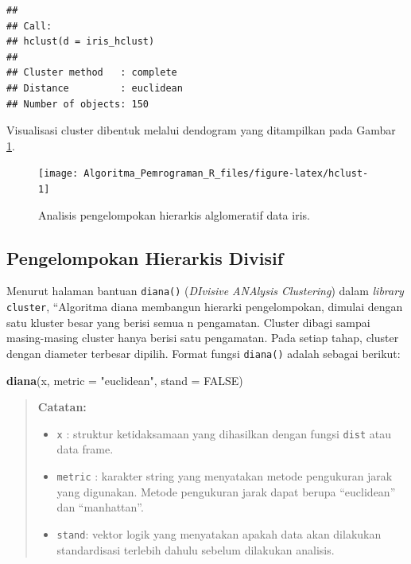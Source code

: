 \documentclass[
]{book}
\newenvironment{Shaded}{\begin{snugshade}}{\end{snugshade}}
\newcommand{\AttributeTok}[1]{\textcolor[rgb]{0.13,0.29,0.53}{#1}}
\newcommand{\ConstantTok}[1]{\textcolor[rgb]{0.56,0.35,0.01}{#1}}
\newcommand{\FunctionTok}[1]{\textcolor[rgb]{0.13,0.29,0.53}{\textbf{#1}}}
\newcommand{\NormalTok}[1]{#1}
\newcommand{\StringTok}[1]{\textcolor[rgb]{0.31,0.60,0.02}{#1}}
\providecommand{\tightlist}{%
  \setlength{\itemsep}{0pt}\setlength{\parskip}{0pt}}
\theoremstyle{definition}
\theoremstyle{definition}
\theoremstyle{definition}
\theoremstyle{definition}
\theoremstyle{remark}
\begin{document}
\begin{verbatim}
## 
## Call:
## hclust(d = iris_hclust)
## 
## Cluster method   : complete 
## Distance         : euclidean 
## Number of objects: 150
\end{verbatim}

Visualisasi cluster dibentuk melalui dendogram yang ditampilkan pada Gambar \ref{fig:hclust}.

\begin{figure}

{\centering \texttt{[image: Algoritma\_Pemrograman\_R\_files/figure-latex/hclust-1]} 

}

\caption{Analisis pengelompokan hierarkis alglomeratif data iris.}\label{fig:hclust}
\end{figure}

\hypertarget{pengelompokan-hierarkis-divisif}{%
\subsection{Pengelompokan Hierarkis Divisif}\label{pengelompokan-hierarkis-divisif}}

Menurut halaman bantuan \texttt{diana()} (\emph{DIvisive ANAlysis Clustering}) dalam \emph{library} \texttt{cluster}, ``Algoritma diana membangun hierarki pengelompokan, dimulai dengan satu kluster besar yang berisi semua n pengamatan. Cluster dibagi sampai masing-masing cluster hanya berisi satu pengamatan. Pada setiap tahap, cluster dengan diameter terbesar dipilih. Format fungsi \texttt{diana()} adalah sebagai berikut:

\begin{Shaded}
\begin{Highlighting}[]
\FunctionTok{diana}\NormalTok{(x, }\AttributeTok{metric =} \StringTok{"euclidean"}\NormalTok{, }\AttributeTok{stand =} \ConstantTok{FALSE}\NormalTok{)}
\end{Highlighting}
\end{Shaded}

\begin{quote}
\textbf{Catatan:}

\begin{itemize}
\tightlist
\item
  \texttt{x} : struktur ketidaksamaan yang dihasilkan dengan fungsi \texttt{dist} atau data frame.
\item
  \texttt{metric} : karakter string yang menyatakan metode pengukuran jarak yang digunakan. Metode pengukuran jarak dapat berupa ``euclidean'' dan ``manhattan''.
\item
  \texttt{stand}: vektor logik yang menyatakan apakah data akan dilakukan standardisasi terlebih dahulu sebelum dilakukan analisis.
\end{itemize}
\end{quote}
\end{document}
